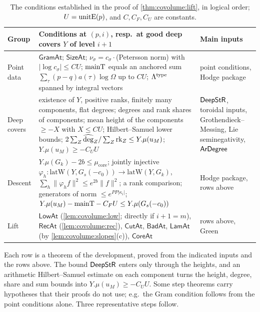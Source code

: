 \begin{table}[htbp]
\centering\footnotesize
\begin{tabular}{@{}>{\raggedright\arraybackslash}p{2.1cm}>{\raggedright\arraybackslash}p{9.1cm}>{\raggedright\arraybackslash}p{3.4cm}@{}}
\toprule
Group & Conditions at $(p,i)$, resp.\ at good deep covers $Y$ of level $i+1$ & Main inputs\\
\midrule
Point data & $\mathsf{GramAt}$; $\mathsf{SizeAt}$; $\nu_\sigma=c_\sigma\cdot$(Petersson norm) with
$|\log c_\sigma|\le CU$; $\mathrm{mainT}$ equals an anchored sum $\sum_\tau(p-q)a(\tau)\log\Omega$ up to
$CU$; $\Lambda^{\mathrm{type}}$ spanned by integral vectors & point conditions, Hodge package\\
Deep covers & existence of $Y$, positive ranks, finitely many components, flat degrees; degrees and
rank shares of components; mean height of the components $\ge-X$ with $X\le CU$; Hilbert--Samuel lower
bounds; $2\sum_Z\widehat{\operatorname{deg}}_Z/\sum_Z\operatorname{rk}_Z\le Y.\mu(u_M)$; $Y.\mu(u_M)\ge-C_UU$ &
$\mathsf{DeepStR}$, toroidal inputs, Grothendieck--Messing, Lie seminegativity, $\mathsf{ArDegree}$\\
Descent & $Y.\mu(G_k)-2b\le\mu_{\mathrm{core}}$; jointly injective
$\varphi_h\colon\mathrm{latW}(Y,G_s(-c_0))\to\mathrm{latW}(Y,G_k)$, $\sum_h\|\varphi_hf\|^2\le
e^{2b}\|f\|^2$; a rank comparison; generators of norm $\le e^{PP|\kappa_i|}$;
$Y.\mu(u_M)-\mathrm{mainT}-C_FU\le Y.\mu(G_s(-c_0))$ & Hodge package, rows above\\
Lift & $\mathsf{LowAt}$ (\cref{lem:covolume:low}; directly if $i+1=m$), $\mathsf{RecAt}$
(\cref{lem:covolume:rec}), $\mathsf{CutAt}$, $\mathsf{BadAt}$, $\mathsf{LamAt}$ (by
\cref{lem:covolume:slopes}(c)), $\mathsf{CoreAt}$ & rows above, Green\\
\bottomrule
\end{tabular}
\caption{The conditions established in the proof of \cref{thm:covolume:lift}, in logical order;
$U=\mathrm{unitE}(p)$, and $C,C_F,C_U$ are constants.}
\label{tab:covolume:conditions}
\end{table}

\begin{proofoutline}
Each row is a theorem of the development, proved from the indicated inputs and the rows above. The
bound $\mathsf{DeepStR}$ enters only through the heights, and an arithmetic Hilbert--Samuel estimate on
each component turns the height, degree, share and sum bounds into $Y.\mu(u_M)\ge-C_UU$. Some step
theorems carry hypotheses that their proofs do not use; e.g.\ the Gram condition follows from the point
conditions alone. Three representative steps follow.
\end{proofoutline}

